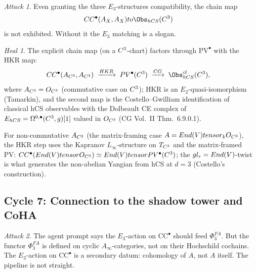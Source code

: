 \documentclass[11pt]{article}
\theoremstyle{definition}
\theoremstyle{remark}
\newtheorem*{attack}{Attack}
\newtheorem*{heal}{Heal}
\newcommand{\CC}{\mathrm{CC}}
\newcommand{\Ainf}{A_{\infty}}
\begin{document}
\begin{attack}
Even granting the three $E_3$-structures compatibility, the chain
map
\[
 \CC^\bullet(A_X, A_X) \to \Obs_{\mathrm{hCS}}(\C^3)
\]
is not exhibited. Without it the $E_3$ matching is a slogan.
\end{attack}

\begin{heal}
The explicit chain map (on a $C^3$-chart) factors through
$\mathrm{PV}^\bullet$ with the HKR map:
\[
 \CC^\bullet(A_{\C^3}, A_{\C^3}) \;\xrightarrow{\mathrm{HKR}}\;
 \mathrm{PV}^\bullet(\C^3) \;\xrightarrow{\mathrm{CG}}\;
 \Obs_{\mathrm{hCS}}^{\mathrm{cl}}(\C^3),
\]
where $A_{C^3} = O_{C^3}$ (commutative case on $C^3$);
HKR is an $E_2$-quasi-isomorphism (Tamarkin), and the second map is
the Costello--Gwilliam identification of classical hCS observables
with the Dolbeault CE complex of
$E_{hCS} = \Omega^{0,\bullet}(C^3, g)[1]$ valued in
$O_{C^3}$ (CG Vol.~II Thm.~6.9.0.1).

For non-commutative $A_{C^3}$ (the matrix-framing case
$A = End(V) tensor_k O_{C^3}$), the HKR step uses the
Kapranov $L_\infty$-structure on $T_{C^3}$ and the matrix-framed
PV: $\CC^\bullet(\mathrm{End}(V) \otimes \cO_{\C^3}) \simeq
\mathrm{End}(V) \otimes \mathrm{PV}^\bullet(\C^3)$; the
$gl_r = End(V)$-twist is what generates the non-abelian
Yangian from hCS at $d = 3$ (Costello's construction).
\end{heal}

\subsection*{Cycle 7: Connection to the shadow tower and CoHA}

\begin{attack}
The agent prompt says the $E_3$-action on $\CC^\bullet$ should
feed $\Phi^{FA}_3$. But the functor $\Phi^{FA}_3$ is defined on
cyclic $\Ainf$-categories, not on their Hochschild cochains. The
$E_3$-action on $\CC^\bullet$ is a secondary datum: cohomology of
$A$, not $A$ itself. The pipeline is not straight.
\end{attack}
\end{document}
